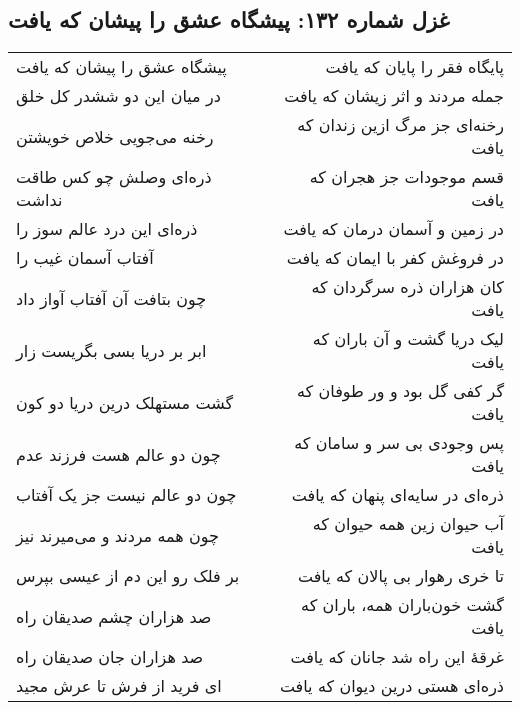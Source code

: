 \begin{center}
\section*{غزل شماره ۱۳۲: پیشگاه عشق را پیشان که یافت}
\label{sec:132}
\begin{longtable}{l p{0.5cm} r}
پیشگاه عشق را پیشان که یافت
&&
پایگاه فقر را پایان که یافت
\\
در میان این دو ششدر کل خلق
&&
جمله مردند و اثر زیشان که یافت
\\
رخنه می‌جویی خلاص خویشتن
&&
رخنه‌ای جز مرگ ازین زندان که یافت
\\
ذره‌ای وصلش چو کس طاقت نداشت
&&
قسم موجودات جز هجران که یافت
\\
ذره‌ای این درد عالم سوز را
&&
در زمین و آسمان درمان که یافت
\\
آفتاب آسمان غیب را
&&
در فروغش کفر با ایمان که یافت
\\
چون بتافت آن آفتاب آواز داد
&&
کان هزاران ذره سرگردان که یافت
\\
ابر بر دریا بسی بگریست زار
&&
لیک دریا گشت و آن باران که یافت
\\
گشت مستهلک درین دریا دو کون
&&
گر کفی گل بود و ور طوفان که یافت
\\
چون دو عالم هست فرزند عدم
&&
پس وجودی بی سر و سامان که یافت
\\
چون دو عالم نیست جز یک آفتاب
&&
ذره‌ای در سایه‌ای پنهان که یافت
\\
چون همه مردند و می‌میرند نیز
&&
آب حیوان زین همه حیوان که یافت
\\
بر فلک رو این دم از عیسی بپرس
&&
تا خری رهوار بی پالان که یافت
\\
صد هزاران چشم صدیقان راه
&&
گشت خون‌باران همه، باران که یافت
\\
صد هزاران جان صدیقان راه
&&
غرقهٔ این راه شد جانان که یافت
\\
ای فرید از فرش تا عرش مجید
&&
ذره‌ای هستی درین دیوان که یافت
\\
\end{longtable}
\end{center}
